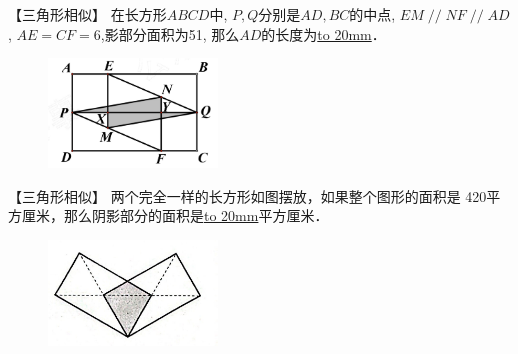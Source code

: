 \item {
    【三角形相似】
    在长方形$ABCD$中, $P,Q$分别是$AD,BC$的中点, $EM\mathop{//}NF\mathop{//}AD$, $AE=CF=6$,影部分面积为51, 那么$AD$的长度为\underline{\hbox to 20mm{}}．
    \begin{figure}[H] 
        \centering
        \includegraphics[width=0.4\textwidth]{./pics/Chapter_3/1.png}
    \end{figure}
    \vspace{1cm}
}

\item {
    【三角形相似】
    {两个完全一样的长方形如图摆放，如果整个图形的面积是 420平方厘米，那么阴影部分的面积是\underline{\hbox to 20mm{}}平方厘米．} 
    \begin{figure}[H] 
        \centering
        \includegraphics[width=0.4\textwidth]{./pics/Chapter_3/5.png}
    \end{figure}
    \vspace{1cm}
}

